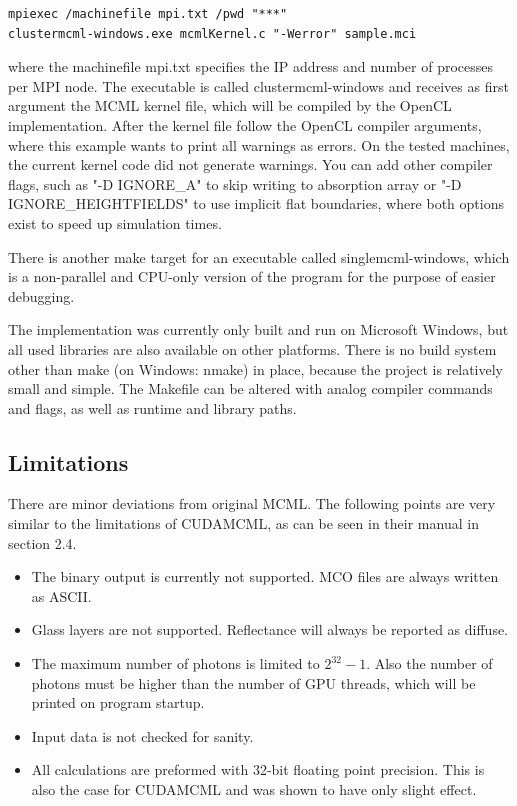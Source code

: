 \documentclass[]{article}
\begin{document}
\begin{lstlisting}
mpiexec /machinefile mpi.txt /pwd "***"
clustermcml-windows.exe mcmlKernel.c "-Werror" sample.mci
\end{lstlisting}

where the machinefile mpi.txt specifies the IP address and number of processes per MPI node. The executable is called clustermcml-windows and receives as first argument the MCML kernel file, which will be compiled by the OpenCL implementation. After the kernel file follow the OpenCL compiler arguments, where this example wants to print all warnings as errors. On the tested machines, the current kernel code did not generate warnings. You can add other compiler flags, such as "-D IGNORE\_A" to skip writing to absorption array or "-D IGNORE\_HEIGHTFIELDS" to use implicit flat boundaries, where both options exist to speed up simulation times.

There is another make target for an executable called singlemcml-windows, which is a non-parallel and CPU-only version of the program for the purpose of easier debugging.

The implementation was currently only built and run on Microsoft Windows, but all used libraries are also available on other platforms. There is no build system other than make (on Windows: nmake) in place, because the project is relatively small and simple. The Makefile can be altered with analog compiler commands and flags, as well as runtime and library paths.

\subsection{Limitations}

There are minor deviations from original MCML. The following points are very similar to the limitations of CUDAMCML, as can be seen in their manual in section 2.4.

\begin{itemize}
\item The binary output is currently not supported. MCO files are always written as ASCII.
\item Glass layers are not supported. Reflectance will always be reported as diffuse.
\item The maximum number of photons is limited to $2^{32}-1$. Also the number of photons must be higher than the number of GPU threads, which will be printed on program startup.
\item Input data is not checked for sanity.
\item All calculations are preformed with 32-bit floating point precision. This is also the case for CUDAMCML and was shown to have only slight effect.
\end{itemize}
\end{document}
